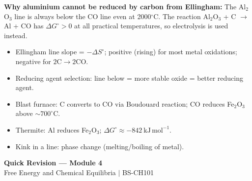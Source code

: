 \documentclass[12pt,a4paper]{article}
\begin{document}
\textbf{Why aluminium cannot be reduced by carbon from Ellingham:} The Al$_2$O$_3$ line is always below the CO line even at 2000$^\circ$C. The reaction Al$_2$O$_3$ + C $\to$ Al + CO has $\Delta G^\circ > 0$ at all practical temperatures, so electrolysis is used instead.

\begin{tcolorbox}[exambox, title={Exam Points (Section 7)}]
\begin{itemize}[leftmargin=*, itemsep=2pt, topsep=2pt]
  \item Ellingham line slope = $-\Delta S^\circ$; positive (rising) for most metal oxidations; negative for $2\mathrm{C}\to2\mathrm{CO}$.
  \item Reducing agent selection: line below = more stable oxide = better reducing agent.
  \item Blast furnace: C converts to CO via Boudouard reaction; CO reduces Fe$_2$O$_3$ above $\sim700^\circ$C.
  \item Thermite: Al reduces Fe$_2$O$_3$; $\Delta G^\circ \approx -842\ \mathrm{kJ\,mol^{-1}}$.
  \item Kink in a line: phase change (melting/boiling of metal).
\end{itemize}
\end{tcolorbox}

\newpage
\begin{center}
  {\large\bfseries\color{myred} Quick Revision --- Module 4}\\[3pt]
  {\small\color{mydark} Free Energy and Chemical Equilibria $|$ BS-CH101}
\end{center}
\noindent{\color{myred}\rule{\linewidth}{1.2pt}}
\vspace{6pt}
\end{document}
